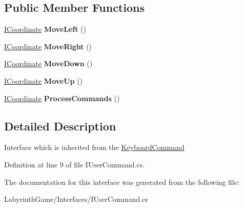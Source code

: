 \subsection*{Public Member Functions}
\begin{DoxyCompactItemize}
\item 
\hypertarget{interface_labyrinth_game_1_1_interfaces_1_1_i_user_command_af7290f1ddd9f104ce8682764a235b84a}{\hyperlink{interface_labyrinth_game_1_1_interfaces_1_1_i_coordinate}{I\+Coordinate} {\bfseries Move\+Left} ()}\label{interface_labyrinth_game_1_1_interfaces_1_1_i_user_command_af7290f1ddd9f104ce8682764a235b84a}

\item 
\hypertarget{interface_labyrinth_game_1_1_interfaces_1_1_i_user_command_a5adeb887ce5d90fc23d15a957fb81856}{\hyperlink{interface_labyrinth_game_1_1_interfaces_1_1_i_coordinate}{I\+Coordinate} {\bfseries Move\+Right} ()}\label{interface_labyrinth_game_1_1_interfaces_1_1_i_user_command_a5adeb887ce5d90fc23d15a957fb81856}

\item 
\hypertarget{interface_labyrinth_game_1_1_interfaces_1_1_i_user_command_a5a2b9bbe219e998aa2f152961aea82f9}{\hyperlink{interface_labyrinth_game_1_1_interfaces_1_1_i_coordinate}{I\+Coordinate} {\bfseries Move\+Down} ()}\label{interface_labyrinth_game_1_1_interfaces_1_1_i_user_command_a5a2b9bbe219e998aa2f152961aea82f9}

\item 
\hypertarget{interface_labyrinth_game_1_1_interfaces_1_1_i_user_command_a18e6cd19052eea0e057489697d783a18}{\hyperlink{interface_labyrinth_game_1_1_interfaces_1_1_i_coordinate}{I\+Coordinate} {\bfseries Move\+Up} ()}\label{interface_labyrinth_game_1_1_interfaces_1_1_i_user_command_a18e6cd19052eea0e057489697d783a18}

\item 
\hypertarget{interface_labyrinth_game_1_1_interfaces_1_1_i_user_command_abf1353ee894d8fbba91d0dbc5aa9d265}{\hyperlink{interface_labyrinth_game_1_1_interfaces_1_1_i_coordinate}{I\+Coordinate} {\bfseries Process\+Commands} ()}\label{interface_labyrinth_game_1_1_interfaces_1_1_i_user_command_abf1353ee894d8fbba91d0dbc5aa9d265}

\end{DoxyCompactItemize}


\subsection{Detailed Description}
Interface which is inherited from the \hyperlink{class_labyrinth_game_1_1_keyboard_command}{Keyboard\+Command} 



Definition at line 9 of file I\+User\+Command.\+cs.



The documentation for this interface was generated from the following file\+:\begin{DoxyCompactItemize}
\item 
Labyrinth\+Game/\+Interfaces/I\+User\+Command.\+cs\end{DoxyCompactItemize}
